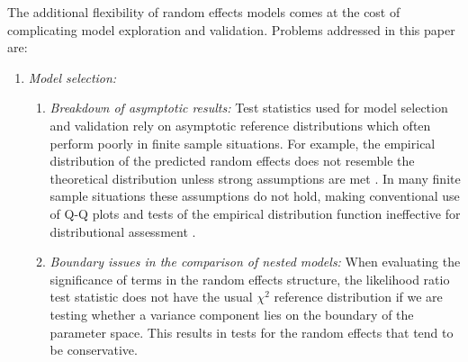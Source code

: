 \documentclass[12pt]{article} %
\newcommand{\hh}[1]{{\color{orange} #1}}
\begin{document}
The additional flexibility of random effects models comes at the cost of complicating model exploration and validation. %
Problems addressed in this paper are:


\begin{enumerate}
\item {\em Model selection:}
\begin{enumerate}
\item {\em Breakdown of  asymptotic results:} Test statistics used for model selection and validation rely on asymptotic reference distributions which often perform poorly in finite sample situations. 
For example, the empirical distribution of the predicted random effects  does not resemble the theoretical distribution unless strong assumptions are met \citep[Theorem 3.2 and Lemma 3.1]{Jiang:1998vt}. In many finite sample situations these assumptions do not hold, making conventional use of Q-Q plots and tests of the empirical distribution function ineffective for distributional assessment \cite[see the supplement of][for supporting simulation results]{adam}.

\item {\em Boundary issues  in the comparison of nested models: } 
When evaluating the significance of terms in the random effects structure, the likelihood ratio test statistic does not have the usual $\chi^2$ reference distribution if we are testing whether a variance component lies on the boundary of the parameter space. This results in tests for the random effects that tend to be conservative.

\end{enumerate}



\end{enumerate}
\end{document}
